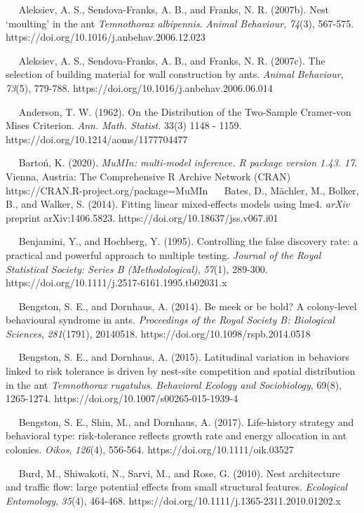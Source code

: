 \documentclass[3p]{elsarticle} %
\begin{document}
~~ Aleksiev, A. S., Sendova-Franks, A. B., and Franks, N. R. (2007b).
Nest `moulting' in the ant \emph{Temnothorax albipennis}. \emph{Animal
Behaviour}, \emph{74}(3), 567-575.
https://doi.org/10.1016/j.anbehav.2006.12.023

~~ Aleksiev, A. S., Sendova-Franks, A. B., and Franks, N. R. (2007c).
The selection of building material for wall construction by ants.
\emph{Animal Behaviour}, \emph{73}(5), 779-788.
https://doi.org/10.1016/j.anbehav.2006.06.014

~~ Anderson, T. W. (1962). On the Distribution of the Two-Sample
Cramer-von Mises Criterion. \emph{Ann. Math. Statist.} 33(3) 1148 -
1159. https://doi.org/10.1214/aoms/1177704477

~~ Bartoń, K. (2020). \emph{MuMIn: multi-model inference. R package
version 1.43. 17}. Vienna, Austria: The Comprehensive R Archive Network
(CRAN) https://CRAN.R-project.org/package=MuMIn ~~ Bates, D., Mächler,
M., Bolker, B., and Walker, S. (2014). Fitting linear mixed-effects
models using lme4. \emph{arXiv} preprint arXiv:1406.5823.
https://doi.org/10.18637/jss.v067.i01

~~ Benjamini, Y., and Hochberg, Y. (1995). Controlling the false
discovery rate: a practical and powerful approach to multiple testing.
\emph{Journal of the Royal Statistical Society: Series B
(Methodological)}, \emph{57}(1), 289-300.
https://doi.org/10.1111/j.2517-6161.1995.tb02031.x

~~ Bengston, S. E., and Dornhaus, A. (2014). Be meek or be bold? A
colony-level behavioural syndrome in ants. \emph{Proceedings of the
Royal Society B: Biological Sciences}, \emph{281}(1791), 20140518.
https://doi.org/10.1098/rspb.2014.0518

~~ Bengston, S. E., and Dornhaus, A. (2015). Latitudinal variation in
behaviors linked to risk tolerance is driven by nest-site competition
and spatial distribution in the ant \emph{Temnothorax rugatulus}.
\emph{Behavioral Ecology and Sociobiology}, 69(8), 1265-1274.
https://doi.org/10.1007/s00265-015-1939-4

~~ Bengston, S. E., Shin, M., and Dornhaus, A. (2017). Life-history
strategy and behavioral type: risk‐tolerance reflects growth rate and
energy allocation in ant colonies. \emph{Oikos}, \emph{126}(4), 556-564.
https://doi.org/10.1111/oik.03527

~~ Burd, M., Shiwakoti, N., Sarvi, M., and Rose, G. (2010). Nest
architecture and traffic flow: large potential effects from small
structural features. \emph{Ecological Entomology}, \emph{35}(4),
464-468. https://doi.org/10.1111/j.1365-2311.2010.01202.x
\end{document}
